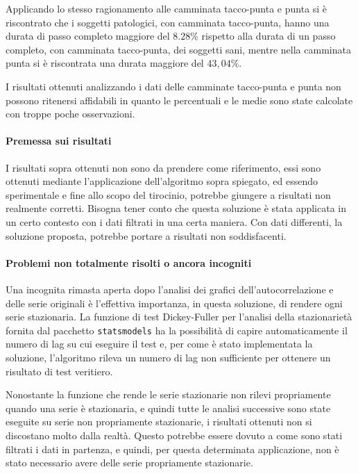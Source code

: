 Applicando lo stesso ragionamento alle camminata tacco-punta e punta si è riscontrato che 
i soggetti patologici, con camminata tacco-punta, hanno una durata di passo completo maggiore del 
$8.28\%$ rispetto alla durata di un passo completo, con camminata tacco-punta, dei soggetti sani, 
mentre nella camminata punta si è riscontrata una durata maggiore del $43,04\%$.

I risultati ottenuti analizzando i dati delle camminate tacco-punta e punta non possono ritenersi affidabili
in quanto le percentuali e le medie sono state calcolate con troppe poche osservazioni.


\paragraph*{Premessa sui risultati}
I risultati sopra ottenuti non sono da prendere come riferimento, essi sono ottenuti
mediante l'applicazione dell'algoritmo sopra spiegato, ed essendo sperimentale e fine allo
scopo del tirocinio, potrebbe giungere a risultati non realmente corretti.
Bisogna tener conto che questa soluzione è stata applicata in un certo contesto con i dati
filtrati in una certa maniera. Con dati differenti, la soluzione proposta, potrebbe 
portare a risultati non soddisfacenti.

\paragraph*{Problemi non totalmente risolti o ancora incogniti}
Una incognita rimasta aperta dopo l'analisi dei grafici dell'autocorrelazione e delle serie originali
è l'effettiva importanza, in questa soluzione, di rendere ogni serie stazionaria. 
La funzione di test Dickey-Fuller per l'analisi della stazionarietà fornita dal 
pacchetto \texttt{statsmodels} ha la possibilità
di capire automaticamente il numero di lag su cui eseguire il test e, per come è stato implementata
la soluzione, l'algoritmo rileva un numero di lag non sufficiente per ottenere un risultato 
di test veritiero.

Nonostante la funzione che rende le serie stazionarie non 
rilevi propriamente quando una serie è stazionaria, e quindi tutte le analisi successive
sono state eseguite su serie non propriamente stazionarie, i risultati ottenuti non
si discostano molto dalla realtà. Questo potrebbe essere dovuto a come sono stati
filtrati i dati in partenza, e quindi, per questa determinata applicazione, non è stato necessario 
avere delle serie propriamente stazionarie.

